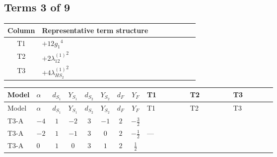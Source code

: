 \documentclass[8pt]{article}
\begin{document}
\begin{landscape}
\subsection*{Terms 3 of 9}
\begin{center}
\begin{tabular}{@{}c >{\raggedright\arraybackslash}p{0.82\linewidth}@{}}
\toprule
Column & Representative term structure \\
\midrule
T1 & \(\displaystyle +12 {g_1}^4\) \\
\midrule
T2 & \(\displaystyle +2 {\lambda_{12}^{(1)}}^2\) \\
\midrule
T3 & \(\displaystyle +4 {\lambda_{HS_2}^{(1)}}^2\) \\
\midrule
\bottomrule
\end{tabular}
\end{center}
\smallskip
\tiny
\begin{longtable}{@{}llcccccc >{\raggedright\arraybackslash}p{0.21\linewidth} >{\raggedright\arraybackslash}p{0.21\linewidth} >{\raggedright\arraybackslash}p{0.21\linewidth}@{}}
\toprule
Model & $\alpha$ & $d_{S_1}$ & $Y_{S_1}$ & $d_{S_2}$ & $Y_{S_2}$ & $d_F$ & $Y_F$ & T1 & T2 & T3 \\
\midrule
\endfirsthead
\toprule
Model & $\alpha$ & $d_{S_1}$ & $Y_{S_1}$ & $d_{S_2}$ & $Y_{S_2}$ & $d_F$ & $Y_F$ & T1 & T2 & T3 \\
\midrule
\endhead
T3-A & $-4$ & $1$ & $-2$ & $3$ & $-1$ & $2$ & $-\frac{3}{2}$ & \scriptsize\adjustbox{max width=\linewidth}{$\begin{gathered} +12 {g_1}^4\end{gathered}$} & \scriptsize\adjustbox{max width=\linewidth}{$\begin{gathered} +2 {\lambda_{12}^{(1)}}^2\end{gathered}$} & \scriptsize\adjustbox{max width=\linewidth}{$\begin{gathered} +4 {\lambda_{HS_2}^{(1)}}^2\end{gathered}$} \\
\midrule
T3-A & $-2$ & $1$ & $-1$ & $3$ & $0$ & $2$ & $-\frac{1}{2}$ & --- & \scriptsize\adjustbox{max width=\linewidth}{$\begin{gathered} +2 {\lambda_{12}^{(1)}}^2\end{gathered}$} & \scriptsize\adjustbox{max width=\linewidth}{$\begin{gathered} +4 {\lambda_{HS_2}^{(1)}}^2\end{gathered}$} \\
\midrule
T3-A & $0$ & $1$ & $0$ & $3$ & $1$ & $2$ & $\frac{1}{2}$ & \scriptsize\adjustbox{max width=\linewidth}{$\begin{gathered} +12 {g_1}^4\end{gathered}$} & \scriptsize\adjustbox{max width=\linewidth}{$\begin{gathered} +2 {\lambda_{12}^{(1)}}^2\end{gathered}$} & \scriptsize\adjustbox{max width=\linewidth}{$\begin{gathered} +4 {\lambda_{HS_2}^{(1)}}^2\end{gathered}$} \\

\end{longtable}
\end{landscape}
\end{document}
